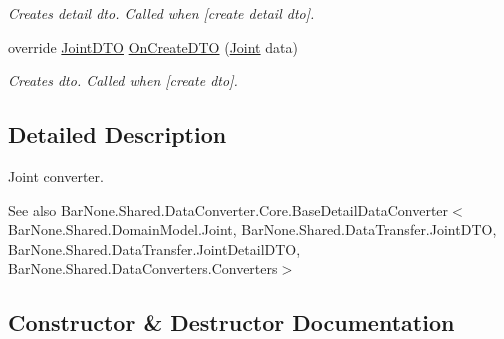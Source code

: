 \begin{DoxyCompactItemize}
\begin{DoxyCompactList}\small\item\em Creates detail dto. Called when \mbox{[}create detail dto\mbox{]}. \end{DoxyCompactList}\item 
override \mbox{\hyperlink{class_bar_none_1_1_shared_1_1_data_transfer_1_1_joint_d_t_o}{Joint\+D\+TO}} \mbox{\hyperlink{class_bar_none_1_1_shared_1_1_data_converters_1_1_joint_converter_a6478aa699dbcbb8ff632fbedfc835652}{On\+Create\+D\+TO}} (\mbox{\hyperlink{class_bar_none_1_1_shared_1_1_domain_model_1_1_joint}{Joint}} data)
\begin{DoxyCompactList}\small\item\em Creates dto. Called when \mbox{[}create dto\mbox{]}. \end{DoxyCompactList}\end{DoxyCompactItemize}


\subsection{Detailed Description}
Joint converter. 

\begin{DoxySeeAlso}{See also}
Bar\+None.\+Shared.\+Data\+Converter.\+Core.\+Base\+Detail\+Data\+Converter$<$\+Bar\+None.\+Shared.\+Domain\+Model.\+Joint, Bar\+None.\+Shared.\+Data\+Transfer.\+Joint\+D\+T\+O, Bar\+None.\+Shared.\+Data\+Transfer.\+Joint\+Detail\+D\+T\+O, Bar\+None.\+Shared.\+Data\+Converters.\+Converters$>$


\end{DoxySeeAlso}


\subsection{Constructor \& Destructor Documentation}
\mbox{\label{class_bar_none_1_1_shared_1_1_data_converters_1_1_joint_converter_aeb8506a4fa2deba3c52978c87fc3f413}} 
